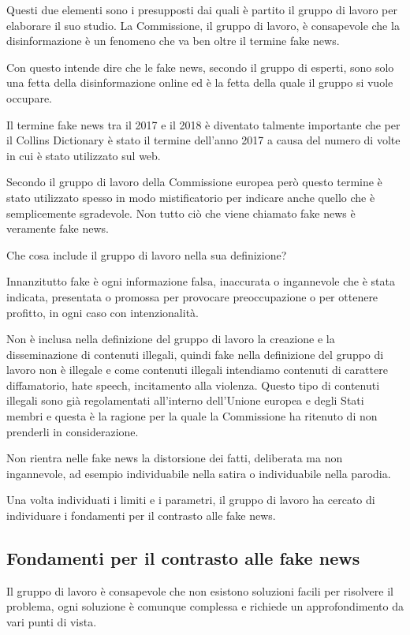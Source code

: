 Questi due elementi sono i presupposti dai quali è partito il gruppo di lavoro per elaborare il suo studio. La Commissione, il gruppo di lavoro, è consapevole che la disinformazione è un fenomeno che va ben oltre il termine fake news.\par
Con questo intende dire che le fake news, secondo il gruppo di esperti, sono solo una fetta della disinformazione online ed è la fetta della quale il gruppo si vuole occupare.\par
Il termine fake news tra il 2017 e il 2018 è diventato talmente importante che per il Collins Dictionary è stato il termine dell'anno 2017 a causa del numero di volte in cui è stato utilizzato sul web. \par
Secondo il gruppo di lavoro della Commissione europea però questo termine è stato utilizzato spesso in modo mistificatorio per indicare anche quello che è semplicemente sgradevole. Non tutto ciò che viene chiamato fake news è veramente fake news. \par 
Che cosa include il gruppo di lavoro nella sua definizione? \par
Innanzitutto fake è ogni informazione falsa, inaccurata o ingannevole che è stata indicata, presentata o promossa per provocare preoccupazione o per ottenere profitto, in ogni caso con intenzionalità. \par
Non è inclusa nella definizione del gruppo di lavoro la creazione e la disseminazione di contenuti illegali, quindi fake nella definizione del gruppo di lavoro non è illegale e come contenuti illegali intendiamo contenuti di carattere diffamatorio, hate speech, incitamento alla violenza. Questo tipo di contenuti illegali sono già regolamentati all'interno dell'Unione europea e degli Stati membri e questa è la ragione per la quale la Commissione ha ritenuto di non prenderli in considerazione.\par
Non rientra nelle fake news la distorsione dei fatti, deliberata ma non ingannevole, ad esempio individuabile nella satira o individuabile nella parodia.\par
Una volta individuati i limiti e i parametri, il gruppo di lavoro ha cercato di individuare i fondamenti per il contrasto alle fake news.
\subsection{Fondamenti per il contrasto alle fake news}

Il gruppo di lavoro è consapevole che non esistono soluzioni facili per risolvere il problema, ogni soluzione è comunque complessa e richiede un approfondimento da vari punti di vista. \par

